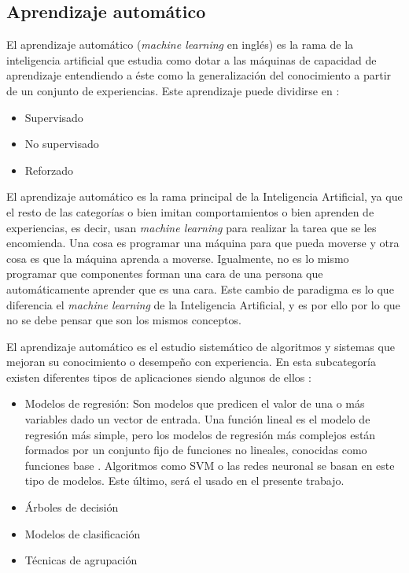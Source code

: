 \subsection{Aprendizaje automático}

El aprendizaje automático (\textit{machine learning} en inglés) es la rama de la inteligencia artificial que estudia como dotar a las máquinas de capacidad de aprendizaje entendiendo a éste como la generalización del conocimiento a partir de un conjunto de experiencias. Este aprendizaje puede dividirse en \cite{amodernapproach}:
\begin{itemize}
\item Supervisado
\item No supervisado
\item Reforzado
\end{itemize}
El aprendizaje automático es la rama principal de la Inteligencia Artificial, ya que el resto de las categorías o bien imitan comportamientos o bien aprenden de experiencias, es decir, usan \textit{machine learning} para realizar la tarea que se les encomienda. Una cosa es programar una máquina para que pueda moverse y otra cosa es que la máquina aprenda a moverse. Igualmente, no es lo mismo programar que componentes forman una cara de una persona que automáticamente aprender que es una cara. Este cambio de paradigma es lo que diferencia el \textit{machine learning} de la Inteligencia Artificial, y es por ello por lo que no se debe pensar que son los mismos conceptos.
\newline

El aprendizaje automático es el estudio sistemático de algoritmos y sistemas que mejoran su conocimiento o desempeño con experiencia. En esta subcategoría existen diferentes tipos de aplicaciones siendo algunos de ellos \cite{amodernapproach}:
\begin{itemize}
\item Modelos de regresión: Son modelos que predicen el valor de una o más variables dado un vector de entrada. Una función lineal es el modelo de regresión más simple, pero los modelos de regresión más complejos están formados por un conjunto fijo de funciones no lineales, conocidas como funciones base \cite{flach}. Algoritmos como SVM o las redes neuronal se basan en este tipo de modelos. Este último, será el usado en el presente trabajo.
\newline

\item Árboles de decisión
\newline

\item Modelos de clasificación
\newline
\item Técnicas de agrupación
\newline
\end{itemize}

